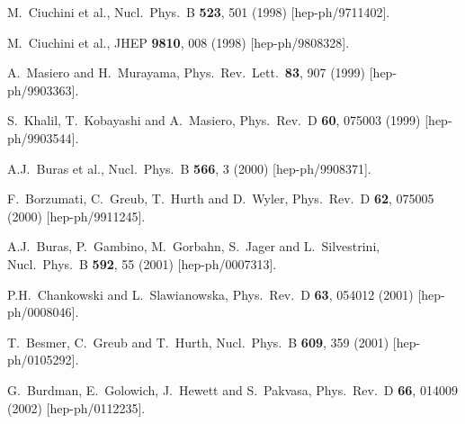 \documentclass[11pt]{article}
\begin{document}
\begin{thebibliography}{999}
M.~Ciuchini et al., 
  Nucl.\ Phys.\ B {\bf 523}, 501 (1998)
  [hep-ph/9711402].

M.~Ciuchini et al.,
  JHEP {\bf 9810}, 008 (1998)
  [hep-ph/9808328].

  A.~Masiero and H.~Murayama,
  Phys.\ Rev.\ Lett.\  {\bf 83}, 907 (1999)
  [hep-ph/9903363].

S.~Khalil, T.~Kobayashi and A.~Masiero,
  Phys.\ Rev.\ D {\bf 60}, 075003 (1999)
  [hep-ph/9903544].

A.J.~Buras et al., 
  Nucl.\ Phys.\ B {\bf 566}, 3 (2000)
  [hep-ph/9908371].

F.~Borzumati, C.~Greub, T.~Hurth and D.~Wyler,
  Phys.\ Rev.\ D {\bf 62}, 075005 (2000)
  [hep-ph/9911245].

A.J.~Buras, P.~Gambino, M.~Gorbahn, S.~Jager and L.~Silvestrini,
  Nucl.\ Phys.\ B {\bf 592}, 55 (2001)
  [hep-ph/0007313].

P.H.~Chankowski and L.~Slawianowska,
  Phys.\ Rev.\ D {\bf 63}, 054012 (2001)
  [hep-ph/0008046].

T.~Besmer, C.~Greub and T.~Hurth,
  Nucl.\ Phys.\ B {\bf 609}, 359 (2001)
  [hep-ph/0105292].

G.~Burdman, E.~Golowich, J.~Hewett and S.~Pakvasa,
  Phys.\ Rev.\ D {\bf 66}, 014009 (2002)
  [hep-ph/0112235].


\end{thebibliography}
\end{document}
